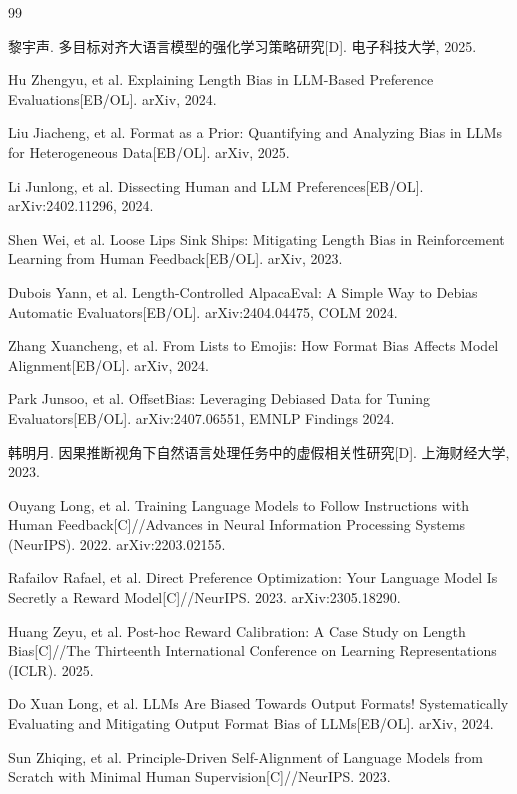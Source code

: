 \documentclass[9pt,a4paper,fontset=windows]{ctexart}
\theoremstyle{definition}
\numberwithin{equation}{section}
\begin{document}
\begin{thebibliography}{99}

 黎宇声. 多目标对齐大语言模型的强化学习策略研究[D]. 电子科技大学, 2025.

 Hu Zhengyu, et al. Explaining Length Bias in LLM-Based Preference Evaluations[EB/OL]. arXiv, 2024.

 Liu Jiacheng, et al. Format as a Prior: Quantifying and Analyzing Bias in LLMs for Heterogeneous Data[EB/OL]. arXiv, 2025.

 Li Junlong, et al. Dissecting Human and LLM Preferences[EB/OL]. arXiv:2402.11296, 2024.

 Shen Wei, et al. Loose Lips Sink Ships: Mitigating Length Bias in Reinforcement Learning from Human Feedback[EB/OL]. arXiv, 2023.

 Dubois Yann, et al. Length-Controlled AlpacaEval: A Simple Way to Debias Automatic Evaluators[EB/OL]. arXiv:2404.04475, COLM 2024.

 Zhang Xuancheng, et al. From Lists to Emojis: How Format Bias Affects Model Alignment[EB/OL]. arXiv, 2024.

 Park Junsoo, et al. OffsetBias: Leveraging Debiased Data for Tuning Evaluators[EB/OL]. arXiv:2407.06551, EMNLP Findings 2024.

 韩明月. 因果推断视角下自然语言处理任务中的虚假相关性研究[D]. 上海财经大学, 2023.

 Ouyang Long, et al. Training Language Models to Follow Instructions with Human Feedback[C]//Advances in Neural Information Processing Systems (NeurIPS). 2022. arXiv:2203.02155.

 Rafailov Rafael, et al. Direct Preference Optimization: Your Language Model Is Secretly a Reward Model[C]//NeurIPS. 2023. arXiv:2305.18290.

 Huang Zeyu, et al. Post-hoc Reward Calibration: A Case Study on Length Bias[C]//The Thirteenth International Conference on Learning Representations (ICLR). 2025.

 Do Xuan Long, et al. LLMs Are Biased Towards Output Formats! Systematically Evaluating and Mitigating Output Format Bias of LLMs[EB/OL]. arXiv, 2024.

 Sun Zhiqing, et al. Principle-Driven Self-Alignment of Language Models from Scratch with Minimal Human Supervision[C]//NeurIPS. 2023.


\end{thebibliography}
\end{document}
